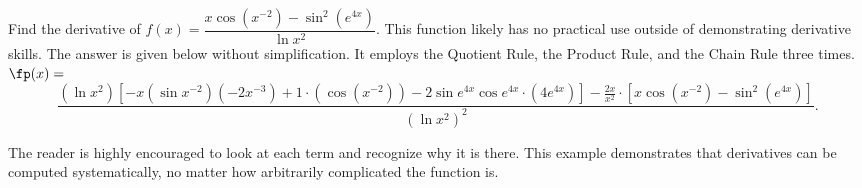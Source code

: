 
\begin{example}\label{ex_chain5}%
Find the derivative of $f(x)=\dfrac{x\cos(x^{-2})-\sin^2(e^{4x})}{\ln x^2}$.
\solution
This function likely has no practical use outside of demonstrating derivative skills. The answer is given below without simplification. It employs the Quotient Rule, the Product Rule, and the Chain Rule three times.\\
\scriptsize
$\fp(x) = $
\[
 \dfrac{(\ln x^2)[-x(\sin x^{-2})(-2x^{-3}) + 1\cdot (\cos (x^{-2})) -2 \sin e^{4x} \cos e^{4x} \cdot (4e^{4x})] - \frac{2x}{x^2} \cdot [x\cos (x^{-2}) -\sin^2(e^{4x})]}
 {(\ln x^2)^2}.
\]%
\normalsize

The reader is highly encouraged to look at each term and recognize why it is there. %
This example demonstrates that derivatives can be computed systematically, no matter how arbitrarily complicated the function is.
\end{example}

